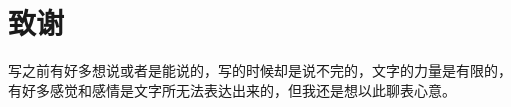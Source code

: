 \documentclass[UTF8,oneside,openany,driverfallback=dvipdfmx,pdfencoding=unicode,hidelinks]{jlutex}
\begin{document}
	\backmatter	

			

	\chapter{致谢}

	写之前有好多想说或者是能说的，写的时候却是说不完的，文字的力量是有限的，有好多感觉和感情是文字所无法表达出来的，但我还是想以此聊表心意。
\end{document}
